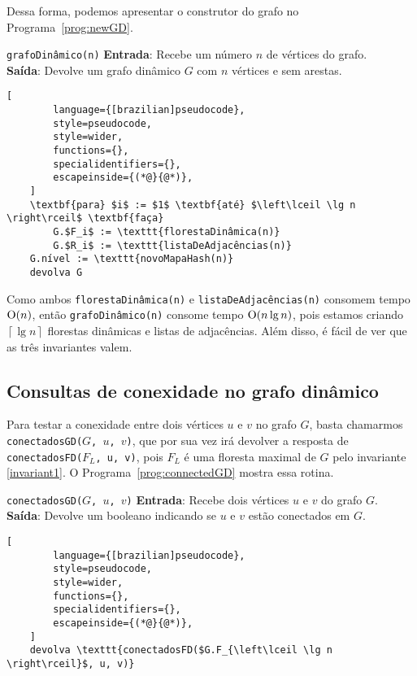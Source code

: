 Dessa forma, podemos apresentar o construtor do grafo no Programa~\ref{prog:newGD}. 

\begin{programruledcaption}{\texttt{grafoDinâmico(n)} \label{prog:newGD}}
    \noindent\textbf{Entrada}: Recebe um número $n$ de vértices do grafo. \\
    \textbf{Saída}: Devolve um grafo dinâmico $G$ com $n$ vértices e sem arestas.
    \vspace{-0.5\baselineskip}
    \begin{lstlisting}[
        language={[brazilian]pseudocode},
        style=pseudocode,
        style=wider,
        functions={},
        specialidentifiers={},
        escapeinside={(*@}{@*)},
    ]
    \textbf{para} $i$ := $1$ \textbf{até} $\left\lceil \lg n \right\rceil$ \textbf{faça}
        G.$F_i$ := \texttt{florestaDinâmica(n)}
        G.$R_i$ := \texttt{listaDeAdjacências(n)}
    G.nível := \texttt{novoMapaHash(n)}
    devolva G
    \end{lstlisting}
    \vspace{-0.5\baselineskip}
\end{programruledcaption}

Como ambos \texttt{florestaDinâmica(n)} e \texttt{listaDeAdjacências(n)} consomem tempo $\mathrm{O}(n)$, então \texttt{grafoDinâmico(n)} consome tempo $\mathrm{O}(n \lg n)$, pois estamos criando $\left\lceil \lg n \right\rceil$ florestas dinâmicas e listas de adjacências. Além disso, é fácil de ver que as três invariantes valem.

\subsection{Consultas de conexidade no grafo dinâmico}
\label{sec:dynamic-graph-connectivity-queries}

Para testar a conexidade entre dois vértices $u$ e $v$ no grafo $G$, basta chamarmos \texttt{conectadosGD($G$, $u$, $v$)}, que por sua vez irá devolver a resposta de \texttt{conectadosFD($F_L$, u, v)}, pois $F_L$ é uma floresta maximal de $G$ pelo invariante \ref{invariant1}. O Programa~\ref{prog:connectedGD} mostra essa rotina.

\begin{programruledcaption}{\texttt{conectadosGD($G$, $u$, $v$)} \label{prog:connectedGD}}
    \noindent\textbf{Entrada}: Recebe dois vértices $u$ e $v$ do grafo $G$. \\
    \textbf{Saída}: Devolve um booleano indicando se $u$ e $v$ estão conectados em $G$.
    \vspace{-0.5\baselineskip}
    \begin{lstlisting}[
        language={[brazilian]pseudocode},
        style=pseudocode,
        style=wider,
        functions={},
        specialidentifiers={},
        escapeinside={(*@}{@*)},
    ]
    devolva \texttt{conectadosFD($G.F_{\left\lceil \lg n \right\rceil}$, u, v)}
    \end{lstlisting}
    \vspace{-0.5\baselineskip}
\end{programruledcaption}

